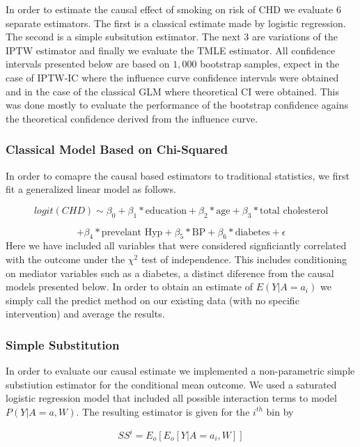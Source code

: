 \documentclass[]{article}
\begin{document}
In order to estimate the causal effect of smoking on risk of CHD we
evaluate 6 separate estimators. The first is a classical estimate made
by logistic regression. The second is a simple subsitution estimator.
The next 3 are variations of the IPTW estimator and finally we evaluate
the TMLE estimator. All confidence intervals presented below are based
on \(1,000\) bootstrap samples, expect in the case of IPTW-IC where the
influence curve confidence intervals were obtained and in the case of
the classical GLM where theoretical CI were obtained. This was done
mostly to evaluate the performance of the bootstrap confidence agains
the theoretical confidence derived from the influence curve.

\subsubsection{Classical Model Based on
Chi-Squared}\label{classical-model-based-on-chi-squared}

In order to comapre the causal based estimators to traditional
statistics, we first fit a generalized linear model as follows.

\[logit(CHD) \sim \beta_0 + \beta_1*\text{education} + \beta_2*\text{age} +\beta_3*\text{total cholesterol} \]

\[+ \beta_4*\text{prevelant Hyp} + \beta_5*\text{BP} + \beta_6*\text{diabetes} + \epsilon\]
Here we have included all variables that were considered signficiantly
correlated with the outcome under the \(\chi^2\) test of independence.
This includes conditioning on mediator variables such as a diabetes, a
distinct diference from the causal models presented below. In order to
obtain an estimate of \(E(Y | A=a_i)\) we simply call the predict method
on our existing data (with no specific intervention) and average the
results.

\subsubsection{Simple Substitution}\label{simple-substitution}

In order to evaluate our causal estimate we implemented a non-parametric
simple substiution estimator for the conditional mean outcome. We used a
saturated logistic regression model that included all possible
interaction terms to model \(P(Y | A=a ,W)\). The resulting estimator is
given for the \(i^{th}\) bin by

\[ SS^{i} = E_o[E_o[Y | A=a_i,W]]\]
\end{document}
